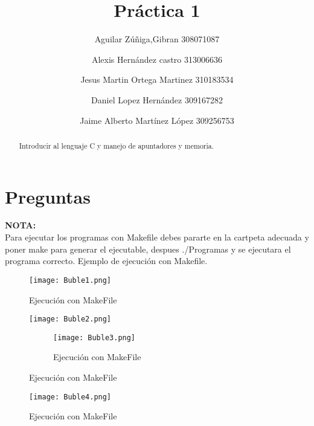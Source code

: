 \documentclass[a4paperx]{article}
\begin{document}
\title{Pr\'actica 1}
\author{
Aguilar Z\'u\~niga,Gibran 308071087 \and  Alexis Hernández castro 313006636 \and Jesus Martin Ortega Martinez 310183534 \and Daniel Lopez Hernández 309167282 \and Jaime Alberto Martínez López 309256753
}

\maketitle

\begin{abstract}
Introducir al lenguaje C y manejo de apuntadores y memoria.
\end{abstract}

\section{Preguntas}

\textbf{NOTA:}\\

Para ejecutar los programas con Makefile debes pararte en la cartpeta adecuada y poner make para generar el ejecutable, despues ./Programas y se ejecutara el programa correcto. Ejemplo de ejecuci\'on con Makefile.\\


\begin{figure}[H]
\centering
\texttt{[image: Buble1.png]}
\caption{Ejecuci\'on con MakeFile}
\end{figure}

\begin{figure}[H]
\centering
\texttt{[image: Buble2.png]}
\caption{Ejecuci\'on con MakeFile}

\begin{figure}[H]
\centering
\texttt{[image: Buble3.png]}
\caption{Ejecuci\'on con MakeFile}
\end{figure}
\end{figure}

\begin{figure}[H]
\centering
\texttt{[image: Buble4.png]}
\caption{Ejecuci\'on con MakeFile}
\end{figure}
\end{document}
